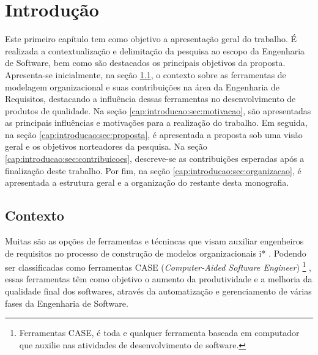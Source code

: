 \chapter{Introdução}
    \label{cap:introducao}
            Este primeiro capítulo tem como objetivo a apresentação geral do trabalho.
            É realizada a contextualização e delimitação da pesquisa ao escopo da Engenharia de Software,
            bem como
            são destacados os principais objetivos da proposta.
                Apresenta-se inicialmente,
                na seção \ref{cap:introducao:sec:contexto},
                o contexto sobre as ferramentas de modelagem organizacional e suas contribuições na área da Engenharia de Requisitos, destacando a influência dessas ferramentas no desenvolvimento de produtos de qualidade.
                Na seção \ref{cap:introducao:sec:motivacao}, são apresentadas as principais influências e motivações para a realização do trabalho.
                Em seguida,
                na seção \ref{cap:introducao:sec:proposta},
                é apresentada a proposta sob uma visão geral e os objetivos norteadores da pesquisa.
                Na seção \ref{cap:introducao:sec:contribuicoes},
                 descreve-se as contribuições esperadas após a finalização deste trabalho.
                Por fim,
                 na seção \ref{cap:introducao:sec:organizacao},
                é apresentada a estrutura geral e a organização do restante desta monografia.
    \section{Contexto}
        \label{cap:introducao:sec:contexto}
            Muitas são as opções de ferramentas e técnincas que visam auxiliar engenheiros de requisitos no processo de construção de modelos organizacionais i* \cite{site2013iwiki} \cite{grau2006comparative}.
            Podendo ser classificadas como ferramentas CASE (\emph{Computer-Aided Software Engineer})
                \footnote{Ferramentas CASE, é toda e qualquer ferramenta baseada em computador que auxilie nas atividades de desenvolvimento de software.}
             \cite{case1985computer}, essas ferramentas têm como objetivo o aumento da produtividade e a melhoria da qualidade final dos softwares,
                 através da automatização e gerenciamento de várias fases da Engenharia de Software.
        
